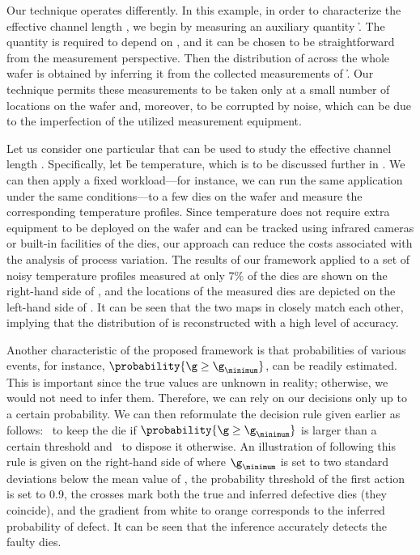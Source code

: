 Our technique operates differently. In this example, in order to characterize
the effective channel length \g, we begin by measuring an auxiliary quantity \h.
The quantity is required to depend on \g, and it can be chosen to be
straightforward from the measurement perspective. Then the distribution of \g
across the whole wafer is obtained by inferring it from the collected
measurements of \h. Our technique permits these measurements to be taken only at
a small number of locations on the wafer and, moreover, to be corrupted by
noise, which can be due to the imperfection of the utilized measurement
equipment.

Let us consider one particular \h that can be used to study the effective
channel length \g. Specifically, let \h be temperature, which is to be discussed
further in . We can then apply a fixed workload---for
instance, we can run the same application under the same conditions---to a few
dies on the wafer and measure the corresponding temperature profiles. Since
temperature does not require extra equipment to be deployed on the wafer and can
be tracked using infrared cameras \cite{mesa-martinez2007} or built-in
facilities of the dies, our approach can reduce the costs associated with the
analysis of process variation. The results of our framework applied to a set of
noisy temperature profiles measured at only 7\% of the dies are shown on the
right-hand side of , and the locations of
the measured dies are depicted on the left-hand side of
. It can be seen that the two maps in
 closely match each other, implying that the
distribution of \g is reconstructed with a high level of accuracy.

Another characteristic of the proposed framework is that probabilities of
various events, for instance, $\probability{\g \geq \g_\minimum}$, can be
readily estimated. This is important since the true values are unknown in
reality; otherwise, we would not need to infer them. Therefore, we can rely on
our decisions only up to a certain probability. We can then reformulate the
decision rule given earlier as follows: \one~to keep the die if $\probability{\g
\geq \g_\minimum}$ is larger than a certain threshold and \two~to dispose it
otherwise. An illustration of following this rule is given on the right-hand
side of  where $\g_\minimum$ is set to two
standard deviations below the mean value of \g, the probability threshold of the
first action is set to 0.9, the crosses mark both the true and inferred
defective dies (they coincide), and the gradient from white to orange
corresponds to the inferred probability of defect. It can be seen that the
inference accurately detects the faulty dies.

